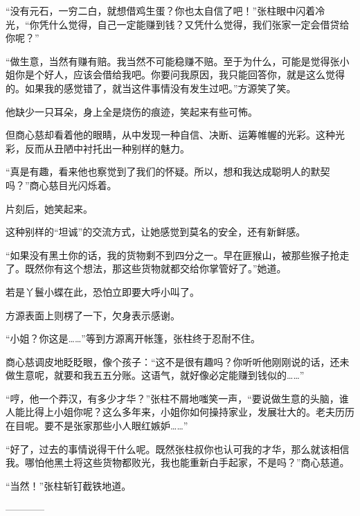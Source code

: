 \begin{this_body}
“没有元石，一穷二白，就想借鸡生蛋？你也太自信了吧！”张柱眼中闪着冷光，“你凭什么觉得，自己一定能赚到钱？又凭什么觉得，我们张家一定会借贷给你呢？”

“做生意，当然有赚有赔。我当然不可能稳赚不赔。至于为什么，可能是觉得张小姐你是个好人，应该会借给我吧。你要问我原因，我只能回答你，就是这么觉得的。如果我的感觉错了，就当这件事情没有发生过吧。”方源笑了笑。

他缺少一只耳朵，身上全是烧伤的痕迹，笑起来有些可怖。

但商心慈却看着他的眼睛，从中发现一种自信、决断、运筹帷幄的光彩。这种光彩，反而从丑陋中衬托出一种别样的魅力。

“真是有趣，看来他也察觉到了我们的怀疑。所以，想和我达成聪明人的默契吗？”商心慈目光闪烁着。

片刻后，她笑起来。

这种别样的“坦诚”的交流方式，让她感觉到莫名的安全，还有新鲜感。

“如果没有黑土你的话，我的货物剩不到四分之一。早在匪猴山，被那些猴子抢走了。既然你有这个想法，那这些货物就都交给你掌管好了。”她道。

若是丫鬟小蝶在此，恐怕立即要大呼小叫了。

方源表面上则楞了一下，欠身表示感谢。

“小姐？你这是……”等到方源离开帐篷，张柱终于忍耐不住。

商心慈调皮地眨眨眼，像个孩子：“这不是很有趣吗？你听听他刚刚说的话，还未做生意呢，就要和我五五分账。这语气，就好像必定能赚到钱似的……”

“哼，他一个莽汉，有多少才华？”张柱不屑地嗤笑一声，“要说做生意的头脑，谁人能比得上小姐你呢？这么多年来，小姐你如何操持家业，发展壮大的。老夫历历在目呢。要不是张家那些小人眼红嫉妒……”

“好了，过去的事情说得干什么呢。既然张柱叔你也认可我的才华，那么就该相信我。哪怕他黑土将这些货物都败光，我也能重新白手起家，不是吗？”商心慈道。

“当然！”张柱斩钉截铁地道。

------------

\end{this_body}

